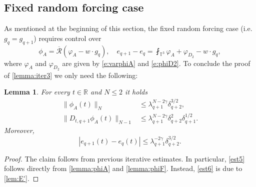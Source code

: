 \documentclass[10pt,a4paper]{amsart}
\numberwithin{equation}{section}
\numberwithin{corollario}{section}
\newtheorem{lemma}{Lemma}
\numberwithin{lemma}{section}
\numberwithin{prop}{section}
\theoremstyle{definition}
\theoremstyle{remark}
\newcommand{\R}{\mathbb{R}}
\newcommand{\T}{\mathbb{T}}
\newcommand{\qq}{_{q+1}}
\begin{document}
\subsection{Fixed random forcing case}
As mentioned at the beginning of this section, the fixed random forcing case (i.e. $g_q=g\qq$) requires control over
\begin{equation}
    \phi_A=\overline{\mathcal{R}}(\varphi_A-w\cdot g_q),\quad e\qq-e_q=\fint_{\T^3}\varphi_A+\varphi_{D_2}-w\cdot g_q,
\end{equation}
where $\varphi_A$ and $\varphi_{D_2}$ are given by \eqref{e:varphiA} and \eqref{e:phiD2}.
To conclude the proof of \autoref{lemma:iter3} we only need the following:
\begin{lemma}
For every $t \in \R$ and $N\le 2$ it holds 
    \begin{align}\label{est5}
        \|\phi_A(t)\|_N&\le \lambda\qq ^{N-2\gamma}\delta_{q+2}^{3/2},
        \\
        \|D_{t,q+1}\phi_A(t)\|_{N-1}&\le \lambda\qq ^{N-2\gamma}\delta_{q+2}^{2}\delta\qq^{1/2} .
    \end{align}  
Moreover,  
    \begin{equation}\label{est6}
        |e\qq(t)-e_q(t)|\le \lambda\qq^{-2\gamma}\delta_{q+2}^{3/2}.
    \end{equation}
\end{lemma}
\begin{proof}
    The claim follows from previous iterative estimates. In particular, \eqref{est5} follows directly from \autoref{lemma:phiA} and \autoref{lemma:phiF}. Instead, \eqref{est6} is due to \autoref{lem:E'}.
\end{proof}

\appendix
\section{}
\end{document}
